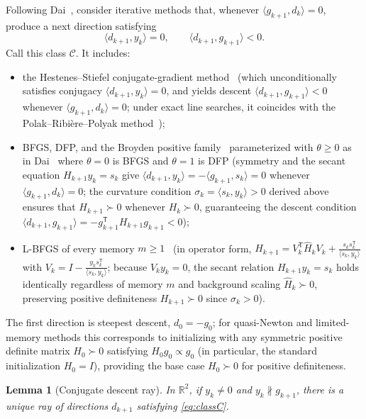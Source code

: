 \documentclass[11pt]{article}
\newtheorem{lemma}[theorem]{Lemma}
\newcommand{\R}{\mathbb{R}}
\newcommand{\ip}[2]{\langle #1,#2\rangle}
\begin{document}
Following Dai~\cite{dai2002}, consider iterative methods that, whenever
$\ip{g_{k+1}}{d_k}=0$, produce a next direction satisfying
\begin{equation}
\label{eq:classC}
\ip{d_{k+1}}{y_k}=0,\qquad \ip{d_{k+1}}{g_{k+1}}<0.
\end{equation}
Call this class $\mathcal C$. It includes:
\begin{itemize}
\item the Hestenes--Stiefel conjugate-gradient method~\cite{hestenes1952}
(which unconditionally satisfies conjugacy $\ip{d_{k+1}}{y_k}=0$, and yields descent
$\ip{d_{k+1}}{g_{k+1}}<0$ whenever $\ip{g_{k+1}}{d_k}=0$; under exact line searches,
it coincides with the Polak--Ribi\`ere--Polyak method~\cite[\S5.2]{nocedalwright2006});
\item BFGS, DFP, and the Broyden positive family~\cite{broyden1970,nocedalwright2006}
parameterized with $\theta \ge 0$ as in Dai~\cite[Eq.~(1.8)]{dai2002} where $\theta=0$ is BFGS and $\theta=1$ is DFP
(symmetry and the secant equation $H_{k+1}y_k=s_k$ give
$\ip{d_{k+1}}{y_k}=-\ip{g_{k+1}}{s_k}=0$ whenever $\ip{g_{k+1}}{d_k}=0$;
the curvature condition $\sigma_k = \ip{s_k}{y_k} > 0$ derived above ensures that $H_{k+1} \succ 0$ whenever $H_k \succ 0$, guaranteeing the descent condition $\ip{d_{k+1}}{g_{k+1}} = -g_{k+1}^{\mathsf T} H_{k+1} g_{k+1} < 0$);
\item L-BFGS of every memory $m\ge1$~\cite{liu1989}
(in operator form, $H_{k+1} = V_k^{\mathsf T}\widehat H_k V_k + \frac{s_k s_k^{\mathsf T}}{\ip{s_k}{y_k}}$ with $V_k = I - \frac{y_k s_k^{\mathsf T}}{\ip{s_k}{y_k}}$; because $V_k y_k = 0$, the secant relation $H_{k+1}y_k=s_k$ holds identically regardless of memory $m$ and background scaling $\widehat H_k \succ 0$, preserving positive definiteness $H_{k+1} \succ 0$ since $\sigma_k > 0$).
\end{itemize}
The first direction is steepest descent, $d_0=-g_0$; for quasi-Newton and limited-memory methods this corresponds to initializing with any symmetric positive definite matrix $H_0 \succ 0$ satisfying $H_0 g_0 \propto g_0$ (in particular, the standard initialization $H_0 = I$), providing the base case $H_0 \succ 0$ for positive definiteness.

\begin{lemma}[Conjugate descent ray]
\label{lem:unique}
In $\R^2$, if $y_k \ne 0$ and $y_k \not\parallel g_{k+1}$, there is a unique ray of directions
$d_{k+1}$ satisfying \eqref{eq:classC}.
\end{lemma}
\end{document}
